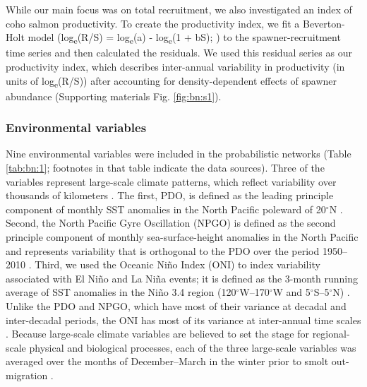 While our main focus was on total recruitment, we also investigated an index of
coho salmon productivity. To create the productivity index, we fit a
Beverton-Holt model (log\textsubscript{e}(R/S) = log\textsubscript{e}(a) -
log\textsubscript{e}(1 + bS); \citealp{Beverton1957a}) to the spawner-recruitment
time series and then calculated the residuals. We used this residual series as
our productivity index, which describes inter-annual variability in productivity
(in units of log\textsubscript{e}(R/S)) after accounting for density-dependent
effects of spawner abundance (Supporting materials Fig. \ref{fig:bn:s1}).


\subsubsection{Environmental variables}

Nine environmental variables were included in the probabilistic networks (Table
\ref{tab:bn:1}; footnotes in that table indicate the data sources). Three of the
variables represent large-scale climate patterns, which reflect variability over
thousands of kilometers \citep{King2011}. The first, PDO, is defined as the
leading principle component of monthly SST anomalies in the North Pacific
poleward of 20$^{\circ}$N \citep{Mantua1997a}.  Second, the North Pacific Gyre
Oscillation (NPGO) is defined as the second principle component of monthly
sea-surface-height anomalies in the North Pacific and represents variability
that is orthogonal to the PDO over the period 1950--2010
\citep{Di-Lorenzo2008a}. Third, we used the Oceanic Ni\~{n}o Index (ONI) to
index variability associated with El Ni\~{n}o and La Ni\~{n}a events; it is
defined as the 3-month running average of SST anomalies in the Ni\~{n}o 3.4
region (120$^{\circ}$W--170$^{\circ}$W and 5$^{\circ}$S--5$^{\circ}$N)
\citep{Trenberth1997}. Unlike the PDO and NPGO, which have most of their
variance at decadal and inter-decadal periods, the ONI has most of its variance
at inter-annual time scales \citep{Sarachik2010a}. Because large-scale climate
variables are believed to set the stage for regional-scale physical and
biological processes, each of the three large-scale variables was averaged over
the months of December--March in the winter prior to smolt out-migration
\citep{Mantua1997a, Yeh2011, DiLorenzo2013a}.

